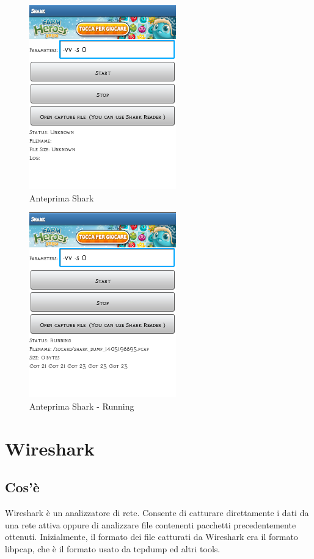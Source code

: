 \documentclass[a4paper,11pt]{book}
\begin{document}
\begin{figure}[h!t]
\centering
\includegraphics[scale = 0.6]{shark}
\caption{Anteprima Shark}
\end{figure}

\begin{figure}[h!t]
\centering
\includegraphics[scale = 0.6]{shark_go}
\caption{Anteprima Shark - Running}
\end{figure}


\clearpage

\section{Wireshark}
\subsection{Cos'\`e}
Wireshark \`e un analizzatore di rete. Consente di catturare direttamente i dati da una rete attiva oppure di analizzare file contenenti pacchetti precedentemente ottenuti. Inizialmente, il formato dei file catturati da Wireshark era il formato libpcap, che \`e il formato usato da tcpdump ed altri tools.
\end{document}
